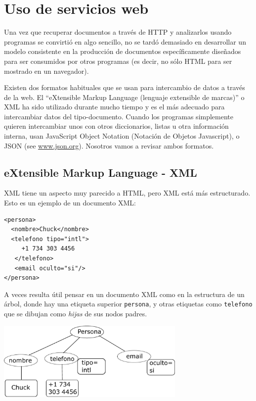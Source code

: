
\chapter{Uso de servicios web}

Una vez que recuperar documentos a través de HTTP y analizarlos usando
programas se convirtió en algo sencillo,
no se tardó demasiado en desarrollar un modelo
consistente en la producción de
documentos específicamente diseñados para ser consumidos por otros
programas (es decir, no sólo HTML para ser mostrado en un navegador).

Existen dos formatos habituales que se usan para intercambio de datos a través de la web.
El ``eXtensible Markup Language (lenguaje extensible de marcas)'' o XML ha sido utilizado
durante mucho tiempo y es el más adecuado para intercambiar datos del tipo-documento.
Cuando los programas simplemente quieren intercambiar unos con otros diccionarios, listas u otra
información interna, usan JavaScript Object Notation (Notación de Objetos Javascript), o JSON
(see \url{www.json.org}). Nosotros vamos a revisar ambos formatos.

\section{eXtensible Markup Language - XML}

XML tiene un aspecto muy parecido a HTML, pero XML está más estructurado.
Esto es un ejemplo de un documento XML:

\beforeverb
\begin{verbatim}
<persona>
  <nombre>Chuck</nombre>
  <telefono tipo="intl">
     +1 734 303 4456
   </telefono>
   <email oculto="si"/>
</persona>
\end{verbatim}
\afterverb
%
A veces resulta útil pensar en un documento XML como en la estructura de un árbol,
donde hay una etiqueta superior {\tt persona}, y otras etiquetas como {\tt telefono}
que se dibujan como \emph{hijas} de sus nodos padres.

\beforefig
\centerline{\includegraphics[height=1.50in]{figs2/xml-tree.eps}}
\afterfig

